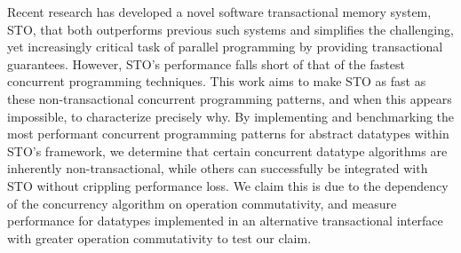 Recent research has developed a novel software transactional memory system, STO, that both outperforms previous such systems and simplifies the challenging, yet increasingly critical task of parallel programming by providing transactional guarantees. However, STO's performance falls short of that of the fastest concurrent programming techniques. This work aims to make STO as fast as these non-transactional concurrent programming patterns, and when this appears impossible, to characterize precisely why. By implementing and benchmarking the most performant concurrent programming patterns for abstract datatypes within STO's framework, we determine that certain concurrent datatype algorithms are inherently non-transactional, while others can successfully be integrated with STO without crippling performance loss. We claim this is due to the dependency of the concurrency algorithm on operation commutativity, and measure performance for datatypes implemented in an alternative transactional interface with greater operation commutativity to test our claim.
